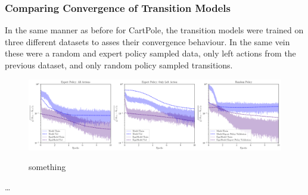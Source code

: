 \subsubsection{Comparing Convergence of Transition Models}
In the same manner as before for CartPole, the transition models were trained on three different datasets to asses their convergence behaviour. In the same vein these were a random and expert policy sampled data, only left actions from the previous dataset, and only random policy sampled transitions. 

\begin{figure}
	\centering
	\includegraphics[width=\linewidth]{Figures/transition_model_cp.png}
	\label{fig:transition_model_catch}
	\caption{something}
\end{figure}

\ldots


